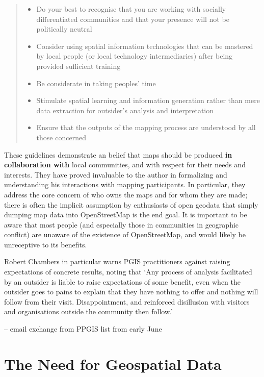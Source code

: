 \documentclass[11pt]{report}
\begin{document}
\begin{quote}\begin{itemize}
\item Do your best to recognise that you are working with socially differentiated communities and that your presence will not be politically neutral
\item Consider using spatial information technologies that can be mastered by local people (or local technology intermediaries) after being provided sufficient training
\item Be considerate in taking peoples' time
\item Stimulate spatial learning and information generation rather than mere data extraction for outsider’s analysis and interpretation
\item Ensure that the outputs of the mapping process are understood by all those concerned
\end{itemize}
\cite{rambaldi2006practical}
\end{quote}

These guidelines demonstrate an belief that maps should be produced \textbf{in collaboration with} local communities, and with respect for their needs and interests. They have proved invaluable to the author in formalizing and understanding his interactions with mapping participants. In particular, they address the core concern of who owns the maps and for whom they are made; there is often the implicit assumption by enthusiasts of open geodata that simply dumping map data into OpenStreetMap is the end goal. It is important to be aware that most people (and especially those in communities in geographic conflict) are unaware of the existence of OpenStreetMap, and would likely be unreceptive to its benefits. 

Robert Chambers in particular warns PGIS practitioners against raising expectations of concrete results, noting that `Any process of analysis facilitated by an outsider is liable to raise expectations of some benefit, even when the outsider goes to pains to explain that they have nothing to offer and nothing will follow from their visit. Disappointment, and reinforced disillusion with visitors and organisations outside the community then follow.'

-- email exchange from PPGIS list from early June 

\chapter{The Need for Geospatial Data}
\label{chap:need}
\end{document}
